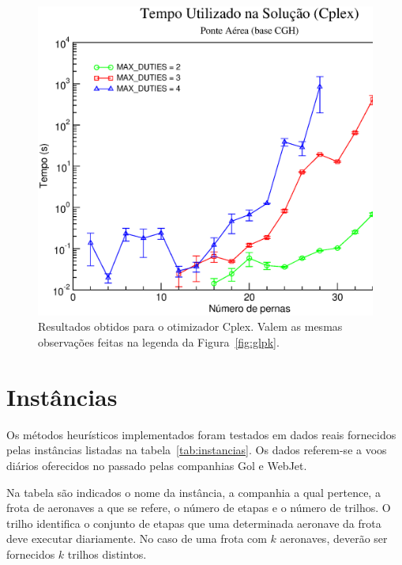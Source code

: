 \begin{figure}[htb]
	\begin{center}
		\includegraphics[scale=0.45,angle=0]{fig/cplex_solution_time.eps}
		\caption{Resultados obtidos para o otimizador Cplex. Valem as mesmas observações feitas na 
		legenda da Figura~\ref{fig:glpk}.}
		\label{fig:cplex}
	\end{center}
\end{figure}


\section{Instâncias}
\label{sec:instancias}

Os métodos heurísticos implementados foram testados em dados reais fornecidos pelas instâncias
listadas na tabela~\ref{tab:instancias}. Os dados referem-se a voos diários oferecidos no passado
pelas companhias Gol e WebJet. 

Na tabela são indicados o nome da instância, a companhia a qual pertence, a frota de aeronaves a que
se refere, o número de etapas e o número de trilhos. O trilho identifica o conjunto de etapas que
uma determinada aeronave da frota deve executar diariamente. No caso de uma frota com $k$ aeronaves,
deverão ser fornecidos $k$ trilhos distintos.

